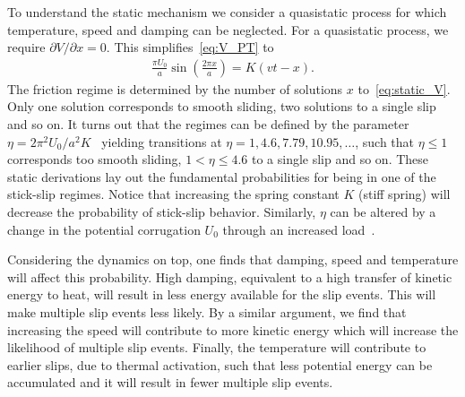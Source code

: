 To understand the static mechanism we consider a quasistatic process for which temperature, speed and damping can be neglected. For a quasistatic process, we require $\partial V/\partial x = 0$. This simplifies~\cref{eq:V_PT} to 
\begin{align}
  \frac{\pi U_0}{a} \sin\left(\frac{2\pi x}{a}\right) = K(vt - x).
  \label{eq:static_V}
\end{align}
The friction regime is determined by the number of solutions $x$ to~\cref{eq:static_V}. Only one solution corresponds to
smooth sliding, two solutions to a single slip and so on. It turns out that the
regimes can be defined by the parameter $\eta = 2\pi^2U_0/a^2K$~\cite{Johnson_1998, Medyanik_2006} yielding transitions at $\eta = 1, 4.6, 7.79, 10.95, \hdots$, such that $\eta \le 1$
corresponds too smooth sliding, $1<\eta \le 4.6$ to a single slip and so on. These static derivations lay out the fundamental probabilities for being in one of the stick-slip regimes. Notice that increasing the spring constant $K$ (stiff spring) will decrease the probability of stick-slip behavior. Similarly, $\eta$ can be altered by a change in the potential corrugation $U_0$ through an increased load~\cite{Vanossi_2013}.

Considering the dynamics on top, one finds that damping, speed and temperature will affect this probability. High damping, equivalent to a high transfer
of kinetic energy to heat, will result in less energy available for the slip events. This will make multiple slip events less likely. By a similar argument, we find that increasing the speed will contribute to more kinetic energy which will increase the likelihood of multiple slip events. Finally, the temperature will contribute to earlier slips, due to thermal activation, such that
less potential energy can be accumulated and it will result in fewer multiple slip events. 







